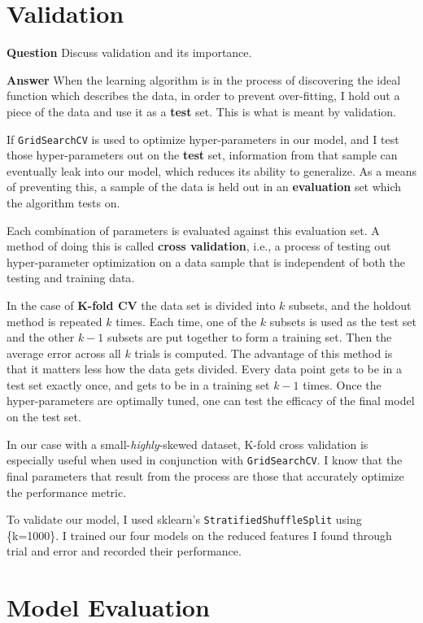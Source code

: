 \documentclass[titlepage,numbers=noenddot,headinclude,%
               footinclude=true,abstractoff,BCOR=5mm,%
               paper=a4,fontsize=11pt,ngerman,american]{scrreprt}
\numberwithin{theorem}{chapter}
\numberwithin{definition}{chapter}
\numberwithin{algorithm}{chapter}
\numberwithin{figure}{chapter}
\numberwithin{table}{chapter}
\numberwithin{equation}{chapter}
\begin{document}
\section*{Validation}

\textbf{Question} Discuss validation and its importance.

\textbf{Answer} When the learning algorithm is in the process of discovering the ideal function which describes the data, in order to prevent over-fitting, I hold out a piece of the data and use it as a \textbf{test} set. This is what is meant by validation.

If \texttt{GridSearchCV} is used to optimize hyper-parameters in our model, and I test those hyper-parameters out on the \textbf{test} set, information from that sample can eventually leak into our model, which reduces its ability to generalize. As a means of preventing this, a sample of the data is held out in an \textbf{evaluation} set which the algorithm tests on.

Each combination of parameters is evaluated against this evaluation set. A method of doing this is called \textbf{cross validation}, i.e., a process of testing out hyper-parameter optimization on a data sample that is independent of both the testing and training data.

In the case of \textbf{K-fold CV} the data set is divided into $k$ subsets, and the holdout method is repeated $k$ times. Each time, one of the $k$ subsets is used as the test set and the other $k-1$ subsets are put together to form a training set. Then the average error across all $k$ trials is computed. The advantage of this method is that it matters less how the data gets divided. Every data point gets to be in a test set exactly once, and gets to be in a training set $k-1$ times. Once the hyper-parameters are optimally tuned, one can test the efficacy of the final model on the test set.

In our case with a small-\emph{highly}-skewed dataset, K-fold cross validation is especially useful when used in conjunction with \texttt{GridSearchCV}. I know that the final parameters that result from the process are those that accurately optimize the performance metric.

To validate our model, I used sklearn's \texttt{StratifiedShuffleSplit} using \{k=1000\}. I trained our four models on the reduced features I found through trial and error and recorded their performance.


\section*{Model Evaluation}
\end{document}
